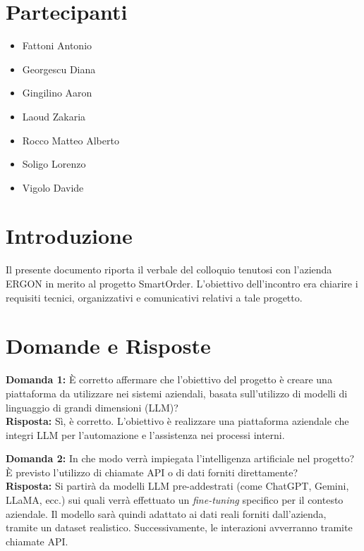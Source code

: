 \documentclass[a4paper,12pt]{article}
\begin{document}
\section{Partecipanti}
{\small
\begin{itemize}[noitemsep, topsep=0pt, parsep=0pt, partopsep=0pt, leftmargin=1.8em]
    \item Fattoni Antonio
    \item Georgescu Diana
    \item Gingilino Aaron
    \item Laoud Zakaria
    \item Rocco Matteo Alberto
    \item Soligo Lorenzo
    \item Vigolo Davide
\end{itemize}
}

\section{Introduzione}
Il presente documento riporta il verbale del colloquio tenutosi con l'azienda ERGON in merito al progetto SmartOrder.
L’obiettivo dell’incontro era chiarire i requisiti tecnici, organizzativi e comunicativi relativi a tale progetto.

\section{Domande e Risposte}

\textbf{Domanda 1:} È corretto affermare che l’obiettivo del progetto è creare una piattaforma da utilizzare nei sistemi aziendali, basata sull’utilizzo di modelli di linguaggio di grandi dimensioni (LLM)?\\[0.5em]
\textbf{Risposta:} Sì, è corretto. L’obiettivo è realizzare una piattaforma aziendale che integri LLM per l’automazione e l’assistenza nei processi interni.

\vspace{2em}

\textbf{Domanda 2:} In che modo verrà impiegata l’intelligenza artificiale nel progetto? È previsto l’utilizzo di chiamate API o di dati forniti direttamente?\\[0.5em]
\textbf{Risposta:} Si partirà da modelli LLM pre-addestrati (come ChatGPT, Gemini, LLaMA, ecc.) sui quali verrà effettuato un \textit{fine-tuning} specifico per il contesto aziendale. Il modello sarà quindi adattato ai dati reali forniti dall’azienda, tramite un dataset realistico. Successivamente, le interazioni avverranno tramite chiamate API.
\end{document}

